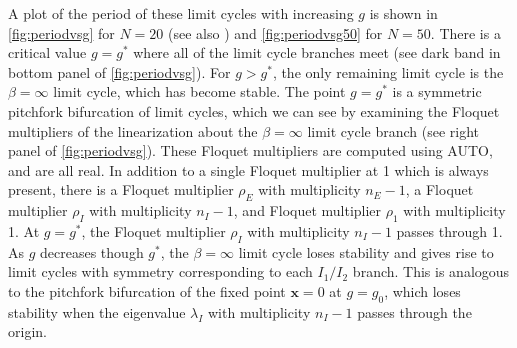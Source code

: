 \documentclass[reqno]{siamonline190516}
\newcommand{\xvec}{\mathbf{x}}
\begin{document}
A plot of the period of these limit cycles with increasing $g$ is shown in \cref{fig:periodvsg} for $N=20$ (see also \cite[Fig. 2]{Barreiro2017}) and \cref{fig:periodvsg50} for $N=50$. There is a critical value $g = g^*$ where all of the limit cycle branches meet (see dark band in bottom panel of \cref{fig:periodvsg}). For $g > g^*$, the only remaining limit cycle is the $\beta = \infty$ limit cycle, which has become stable. The point $g = g^*$ is a symmetric pitchfork bifurcation of limit cycles, which we can see by examining the Floquet multipliers of the linearization about the $\beta = \infty$ limit cycle branch (see right panel of \cref{fig:periodvsg}). These Floquet multipliers are computed using AUTO, and are all real. In addition to a single Floquet multiplier at 1 which is always present, there is a Floquet multiplier $\rho_E$ with multiplicity $n_E - 1$, a Floquet multiplier $\rho_I$ with multiplicity $n_I - 1$, and Floquet multiplier $\rho_1$ with multiplicity 1. At $g = g^*$, the Floquet multiplier $\rho_I$ with multiplicity $n_I - 1$ passes through 1. As $g$ decreases though $g^*$, the $\beta = \infty$ limit cycle loses stability and gives rise to limit cycles with symmetry corresponding to each $I_1/I_2$ branch. This is analogous to the pitchfork bifurcation of the fixed point $\xvec = 0$ at $g = g_0$, which loses stability when the eigenvalue $\lambda_I$ with multiplicity $n_I - 1$ passes through the origin.
\end{document}
